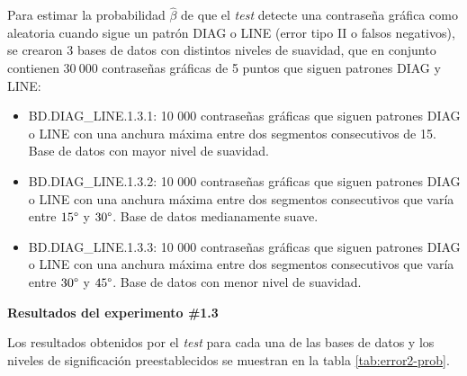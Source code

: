 \documentclass[12pt]{report}
\begin{document}
Para estimar la probabilidad $\hat{\beta}$ de que el \textit{test} detecte una contraseña gráfica como aleatoria cuando sigue un patrón DIAG o LINE  (error tipo II o falsos negativos), se crearon 3 bases de datos con distintos niveles de suavidad, que en conjunto contienen $30\ 000$ contraseñas gráficas de 5 puntos que siguen patrones DIAG y LINE:
\begin{itemize}
	\item BD.DIAG\_LINE.1.3.1: 10 000 contraseñas gráficas que siguen patrones DIAG o LINE con una anchura máxima entre dos segmentos consecutivos de 15\degree. Base de datos con mayor nivel de suavidad. 
	\item BD.DIAG\_LINE.1.3.2: 10 000 contraseñas gráficas que siguen patrones DIAG o LINE con una anchura máxima entre dos segmentos consecutivos que varía entre $15\degree$ y $30\degree$. Base de datos medianamente suave.
	\item BD.DIAG\_LINE.1.3.3: 10 000 contraseñas gráficas que siguen patrones DIAG o LINE con una anchura máxima entre dos segmentos consecutivos que varía entre $30\degree$ y $45\degree$. Base de datos con menor nivel de suavidad.
\end{itemize}
\textbf{Resultados del experimento \#1.3}

Los resultados obtenidos por el \textit{test}  para cada una de las bases de datos y los  niveles de significación preestablecidos se muestran en la tabla \ref{tab:error2-prob}.
\end{document}
